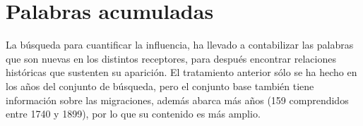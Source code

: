 \chapter{Palabras acumuladas}

La búsqueda para cuantificar la influencia, ha llevado a contabilizar las
palabras que son nuevas en los distintos receptores, para después encontrar relaciones históricas que sustenten su aparición.  El tratamiento anterior sólo se ha hecho en los años del conjunto de búsqueda, pero  el conjunto base  también tiene información sobre las migraciones, además abarca más años (159 comprendidos entre 1740 y 1899), por lo que su contenido es más amplio. 












